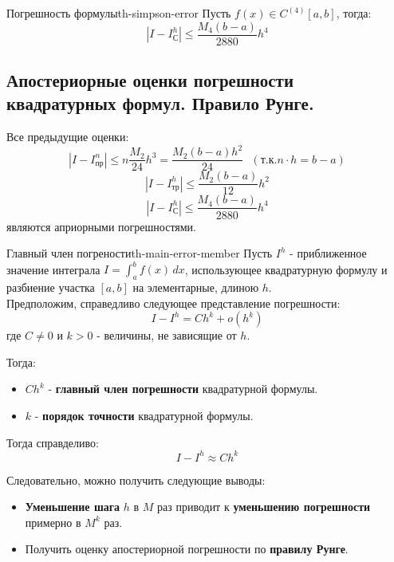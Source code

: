 \documentclass[14pt]{extarticle}
\begin{document}
    \begin{theorem}{Погрешность формулы}{th-simpson-error}
        Пусть $f(x) \in C^{(4)}[a, b]$, тогда:
        $$|I - I_{\text{С}}^{h}| \leq \frac{M_{4}(b - a)}{2880} h^{4}$$
    \end{theorem}

\clearpage
\subsection{Апостериорные оценки погрешности квадратурных формул. Правило Рунге.}

    Все предыдущие оценки:
    $$|I - I_{\text{пр}}^{n}| \leq n \frac{M_{2}}{24}h^{3} = \frac{M_{2}(b - a)h^{2}}{24} \text{ } (\text{т.к.} n \cdot h = b - a)$$
    $$|I - I_{\text{тр}}^{h}| \leq \frac{M_{2}(b - a)}{12}h^{2}$$
    $$|I - I_{\text{С}}^{h}| \leq \frac{M_{4}(b - a)}{2880} h^{4}$$
    являются априорными погрешностями.\\

    \begin{theorem}{Главный член погрености}{th-main-error-member}
        Пусть $I^{h}$ - приближенное значение интеграла $I = \int_{a}^{b} f(x) \, dx$, использующее квадратурную формулу и разбиение участка $[a, b]$ на элементарные, длиною $h$.\\
        Предположим, справедливо следующее представление погрешности:
        $$I - I^{h} = Ch^{k} + o(h^{k})$$
        где $C \neq 0$ и $k > 0$ - величины, не зависящие от $h$.

        \vspace{\baselineskip}

        Тогда: 
        \begin{itemize}
            \item $Ch^{k}$ - \textbf{главный член погрешности} квадратурной формулы.
            \item $k$ - \textbf{порядок точности} квадратурной формулы.
        \end{itemize}

        \vspace{\baselineskip}
        
        Тогда справделиво:
        $$I - I^{h} \approx Ch^{k}$$

        Следовательно, можно получить следующие выводы:
        \begin{itemize}
            \item \textbf{Уменьшение шага} $h$ в $M$ раз приводит к \textbf{уменьшению погрешности} примерно в $M^{k}$ раз.
            \item Получить оценку апостериорной погрешности по \textbf{правилу Рунге}.
        \end{itemize}
    \end{theorem}
\end{document}

